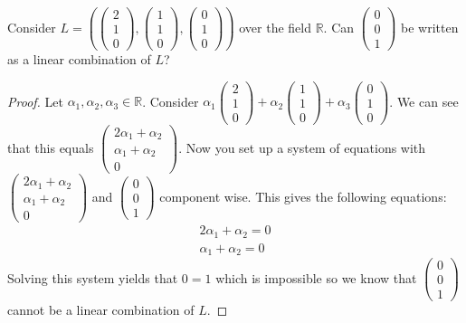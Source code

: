 \begin{example}
    Consider $L=\left(\begin{pmatrix}
        2 \\ 1 \\ 0
    \end{pmatrix}, \begin{pmatrix}
        1 \\ 1 \\ 0
    \end{pmatrix},\begin{pmatrix}
        0 \\ 1 \\ 0
    \end{pmatrix}\right)$ over the field $\mathbb{R}$. Can $\begin{pmatrix}
        0 \\ 0 \\ 1
    \end{pmatrix}$ be written as a linear combination of $L$?
    \begin{proof}
        Let $\alpha_1,\alpha_2,\alpha_3\in\mathbb{R}$. Consider $\alpha_1\begin{pmatrix}
        2 \\ 1 \\ 0
    \end{pmatrix}+\alpha_2 \begin{pmatrix}
        1 \\ 1 \\ 0
    \end{pmatrix}+\alpha_3\begin{pmatrix}
        0 \\ 1 \\ 0
    \end{pmatrix}$. We can see that this equals $\begin{pmatrix}
        2\alpha_1+\alpha_2 \\ \alpha_1+\alpha_2 \\ 0
    \end{pmatrix}$. Now you set up a system of equations with $\begin{pmatrix}
        2\alpha_1+\alpha_2 \\ \alpha_1+\alpha_2 \\ 0
    \end{pmatrix}$ and $\begin{pmatrix}
        0 \\ 0 \\ 1
    \end{pmatrix}$ component wise. This gives the following equations:
        \begin{align*}
            2\alpha_1+\alpha_2=0\\
            \alpha_1+\alpha_2=0
        \end{align*}
        Solving this system yields that $0=1$ which is impossible so we know that $\begin{pmatrix}
        0 \\ 0 \\ 1
    \end{pmatrix}$ cannot be a linear combination of $L$.
    \end{proof}
\end{example}
